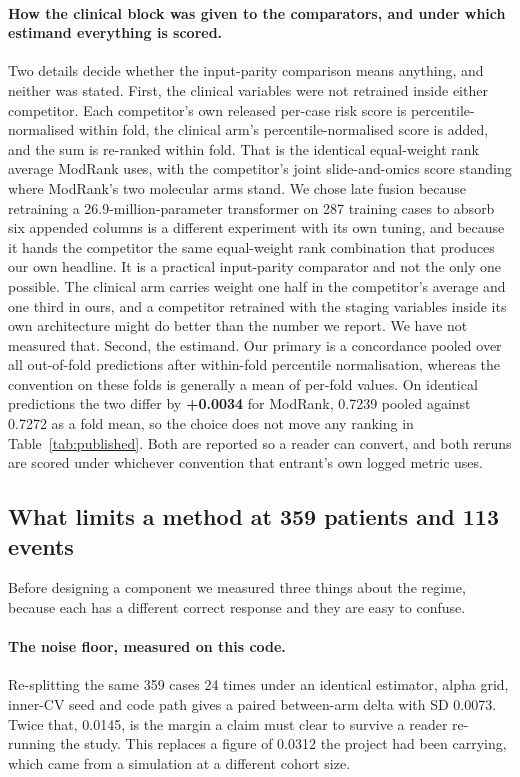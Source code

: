 \documentclass[11pt]{article}
\begin{document}
\paragraph{How the clinical block was given to the comparators, and under which estimand
everything is scored.} Two details decide whether the input-parity comparison means anything, and
neither was stated. First, the clinical variables were not retrained inside either competitor. Each
competitor's own released per-case risk score is percentile-normalised within fold, the clinical
arm's percentile-normalised score is added, and the sum is re-ranked within fold. That is the
identical equal-weight rank average ModRank uses, with the competitor's joint slide-and-omics score
standing where ModRank's two molecular arms stand. We chose late fusion because retraining a
26.9-million-parameter transformer on 287 training cases to absorb six appended columns is a
different experiment with its own tuning, and because it hands the competitor the same
equal-weight rank combination that produces our own headline. It is a practical input-parity
comparator and not the only one possible. The clinical arm carries weight one half in the
competitor's average and one third in ours, and a competitor retrained with the staging variables
inside its own architecture might do better than the number we report. We have not measured
that. Second, the estimand. Our primary is a concordance pooled over all out-of-fold predictions
after within-fold percentile normalisation, whereas the convention on these folds is generally a
mean of per-fold values. On identical predictions the two differ by \textbf{+0.0034} for ModRank,
0.7239 pooled against 0.7272 as a fold mean, so the choice does not move any ranking in
Table~\ref{tab:published}. Both are reported so a reader can convert, and both reruns are scored
under whichever convention that entrant's own logged metric uses.

\subsection{What limits a method at 359 patients and 113 events}

Before designing a component we measured three things about the regime, because each has a
different correct response and they are easy to confuse.

\paragraph{The noise floor, measured on this code.} Re-splitting the same 359 cases 24 times under
an identical estimator, alpha grid, inner-CV seed and code path gives a paired between-arm delta
with SD 0.0073. Twice that, 0.0145, is the margin a claim must clear to survive a
reader re-running the study. This replaces a figure of 0.0312 the project had been carrying, which
came from a simulation at a different cohort size.
\end{document}
